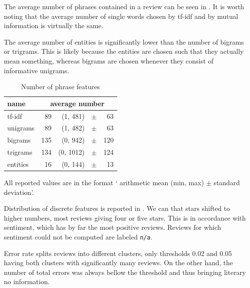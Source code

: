 The average number of phrases contained in a review can be seen in .
It is worth noting that the average number of single words chosen by tf-idf and by mutual information is virtually the same.

The average number of entities is significantly lower than the number of bigrams or trigrams.
This is likely because the entities are chosen such that they actually mean something,
whereas bigrams are chosen whenever they consist of informative unigrams.
\begin{table}[h!]
\centering
\begin{tabular}{lr@{~}r@{~}r@{~}r}
\toprule
\textbf{name}	& \multicolumn{4}{c}{\textbf{average number}} \\
\midrule
tf-idf  & 89 & (1, 481) & $\pm$& 63 \\
unigrams & 89 & (1, 482) & $\pm$& 63 \\
bigrams & 135 & (0, 942) & $\pm$ &120 \\
trigrams & 134 & (0, 1012) & $\pm$& 124 \\
entities & 16 & (0, 144) & $\pm$ &13 \\
\bottomrule
\end{tabular}


\caption{Number of phrase features}\label{tab:phrase_feat_nu}
All reported values are in the format ` arithmetic mean (min, max) $\pm$ standard deviation'.
\end{table}


Distribution of discrete features is reported in .
We can that stars shifted to higher numbers, most reviews giving
four or five stars.
This is in accordance with sentiment, which has by far the most positive reviews.
Reviews for which sentiment could not be computed are labeled \texttt{n/a}.

Error rate splits reviews into different clusters, only thresholds 0.02 and 0.05
having both clusters with significantly many reviews.
On the other hand, the number of total errors was always bellow the threshold and 
thus bringing literary no information.

